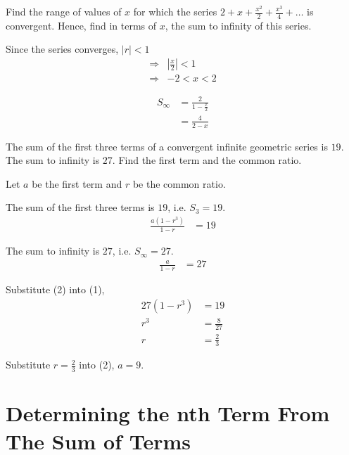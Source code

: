 \documentclass[11pt,a4paper]{book}
\begin{document}
\begin{example}

Find the range of values of $x$ for which the series ${\displaystyle 2+x+\frac{x^{2}}{2}+\frac{x^{3}}{4}+\ldots}$
is convergent. Hence, find in terms of $x$, the sum to infinity of
this series.

\Solution

Since the series converges, $\left|r\right|<1$
\begin{align*}
\Rightarrow & \left|\frac{x}{2}\right|<1\\
\Rightarrow & -2<x<2
\end{align*}

\begin{align*}
S_{\infty} & =\frac{2}{1-\frac{x}{2}}\\
 & =\frac{4}{2-x}
\end{align*}

\end{example}

\newpage

\begin{example}

The sum of the first three terms of a convergent infinite geometric series is $19$. The sum to infinity is $27$. Find the first term and the common ratio.

\Solution

Let $a$ be the first term and $r$ be the common ratio. 

The sum of the first three terms is $19$, i.e. $S_{3}=19$.
\begin{align*}
\frac{a\left(1-r^{3}\right)}{1-r} & =19\tag{1}
\end{align*}

The sum to infinity is $27$, i.e. $S_{\infty}=27$.
\begin{align*}
\frac{a}{1-r} & =27\tag{2}
\end{align*}

Substitute (2) into (1), 
\begin{align*}
27\left(1-r^{3}\right) & =19\\
r^{3} & =\frac{8}{27}\\
r & =\frac{2}{3}
\end{align*}

Substitute ${\displaystyle r=\frac{2}{3}}$ into (2), $a=9$.

\end{example}


\section{Determining the nth Term From The Sum of Terms}
\end{document}
